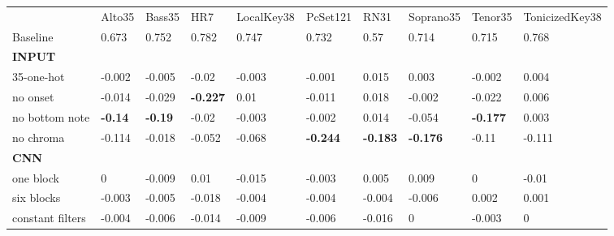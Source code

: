 \begin{tabular}{llllllllll}
                                & Alto35         & Bass35         & HR7             & LocalKey38      & PcSet121        & RN31            & Soprano35       & Tenor35         & TonicizedKey38  \\
Baseline                        & 0.673          & 0.752          & 0.782           & 0.747           & 0.732           & 0.57            & 0.714           & 0.715           & 0.768           \\
\textbf{INPUT}                  &                &                &                 &                 &                 &                 &                 &                 &                 \\
35-one-hot                      & -0.002         & -0.005         & -0.02           & -0.003          & -0.001          & 0.015           & 0.003           & -0.002          & 0.004           \\
no onset                        & -0.014         & -0.029         & \textbf{-0.227} & 0.01            & -0.011          & 0.018           & -0.002          & -0.022          & 0.006           \\
no bottom note                  & \textbf{-0.14} & \textbf{-0.19} & -0.02           & -0.003          & -0.002          & 0.014           & -0.054          & \textbf{-0.177} & 0.003           \\
no chroma                       & -0.114         & -0.018         & -0.052          & -0.068          & \textbf{-0.244} & \textbf{-0.183} & \textbf{-0.176} & -0.11           & -0.111          \\
\textbf{CNN}                    &                &                &                 &                 &                 &                 &                 &                 &                 \\
one block                       & 0              & -0.009         & 0.01            & -0.015          & -0.003          & 0.005           & 0.009           & 0               & -0.01           \\
six blocks                      & -0.003         & -0.005         & -0.018          & -0.004          & -0.004          & -0.004          & -0.006          & 0.002           & 0.001           \\
constant filters                & -0.004         & -0.006         & -0.014          & -0.009          & -0.006          & -0.016          & 0               & -0.003          & 0               \\

\end{tabular}
